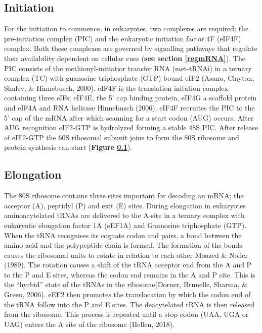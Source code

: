 \documentclass[
  12pt,
  openany]{book}
\begin{document}
\subsection{Initiation} \label{initiation}

For the initiation to commence, in eukaryotes, two complexes are required; the pre-initiation complex (PIC) and the eukaryotic initiation factor 4F (eIF4F) complex. Both these complexes are governed by signalling pathways that regulate their availability dependent on cellular cues (\textbf{see section \ref{regmRNA}}). The PIC consists of the methionyl-initiatior transfer RNA (met-tRNAi) in a ternary complex (TC) with guanosine triphosphate (GTP) bound eIF2 (Asano, Clayton, Shalev, \& Hinnebusch, 2000). eIF4F is the translation initation complex containing three eIFs; eIF4E, the 5' cap binding protein, eIF4G a scaffold protein and eIF4A and RNA helicase Hinnebusch (2006). eIF4F recruites the PIC to the 5' cap of the mRNA after which scanning for a start codon (AUG) occurs. After AUG recognition eIF2-GTP is hydrolyzed forming a stable 48S PIC. After release of eIF2-GTP the 60S ribosomal subunit joins to form the 80S ribosome and protein synthesis can start (\textbf{Figure \ref{initiation}}).

\subsection{Elongation}

The 80S ribosome contains three sites important for decoding an mRNA; the acceptor (A), peptidyl (P) and exit (E) sites. During elongation in eukaryotes aminoacytelated tRNAs are delivered to the A-site in a ternary complex with eukaryotic elongation factor 1A (eEF1A) and Guanosine triphosphate (GTP). When the tRNA recognises its cognate codon and pairs, a bond between the amino acid and the polypeptide chain is formed. The formation of the bonds causes the ribosomal units to rotate in relation to each other Moazed \& Noller (1989). The rotation causes a shift of the tRNA acceptor end from the A and P to the P and E sites, whereas the codon end remains in the A and P site. This is the ``hyrbid'' state of the tRNAs in the ribosome(Dorner, Brunelle, Sharma, \& Green, 2006). eEF2 then promotes the translocation by which the codon end of the tRNA follow into the P and E sites. The deacytelated tRNA is then released from the ribosome. This process is repeated until a stop codon (UAA, UGA or UAG) enters the A site of the ribosome (Hellen, 2018).
\end{document}
